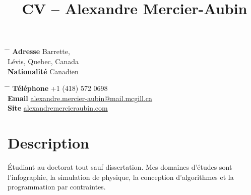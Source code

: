 \documentclass[10pt]{article} %
\begin{document}

\title{CV -- Alexandre Mercier-Aubin} %


\parbox{0.5\textwidth}{ %
\begin{tabbing} %
\hspace{3cm} \= \hspace{4cm} \= \kill %
{\bf Adresse}  Barrette,\\ %
\> Lévis, Quebec, Canada \\ %
{\bf Nationalité} \> Canadien %
\end{tabbing}}
\hfill %
\parbox{0.5\textwidth}{ %
\begin{tabbing} %
\hspace{3cm} \= \hspace{4cm} \= \kill %
{\bf Téléphone} \> +1 (418) 572 0698 \\ %
{\bf Email} \> \href{mailto:alexandre.mercier-aubin@mail.mcgill.ca}{alexandre.mercier-aubin@mail.mcgill.ca} \\ %
{\bf Site} \> \href{https://alexandremercieraubin.com}{alexandremercieraubin.com} \\
\end{tabbing}}


\section{Description}

Étudiant au doctorat tout sauf dissertation. Mes domaines d'études sont l'infographie, la simulation de physique, la conception
d'algorithmes et la programmation par contraintes.

\end{document}
